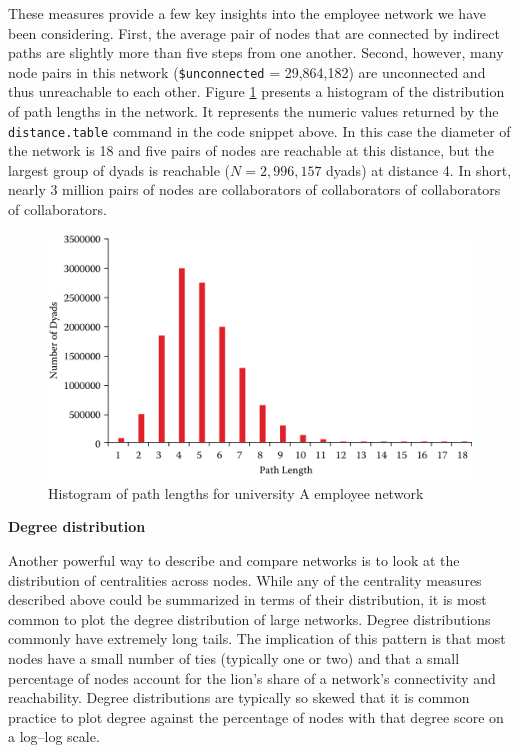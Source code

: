 \documentclass[]{krantz}
\begin{document}
These measures provide a few key insights into the employee network we
have been considering. First, the average pair of nodes that are
connected by indirect paths are slightly more than five steps from one
another. Second, however, many node pairs in this network
(\texttt{\$unconnected} = 29,864,182) are unconnected and thus
unreachable to each other. Figure \ref{fig:fig8-5} presents a histogram
of the distribution of path lengths in the network. It represents the
numeric values returned by the \texttt{distance.table} command in the
code snippet above. In this case the diameter of the network is 18 and
five pairs of nodes are reachable at this distance, but the largest
group of dyads is reachable (\(N=2{,}996{,}157\) dyads) at distance 4.
In short, nearly 3 million pairs of nodes are collaborators of
collaborators of collaborators of collaborators.

\begin{figure}

{\centering \includegraphics[width=0.7\linewidth]{ChapterNetworks/figures/fig8-5} 

}

\caption{Histogram of path lengths for university A employee network}\label{fig:fig8-5}
\end{figure}

\textbf{Degree distribution}

Another powerful way to describe and compare networks is to look at the
distribution of centralities across nodes. While any of the centrality
measures described above could be summarized in terms of their
distribution, it is most common to plot the degree distribution of large
networks. Degree distributions commonly have extremely long tails. The
implication of this pattern is that most nodes have a small number of
ties (typically one or two) and that a small percentage of nodes account
for the lion's share of a network's connectivity and reachability.
Degree distributions are typically so skewed that it is common practice
to plot degree against the percentage of nodes with that degree score on
a log--log scale.
\end{document}
